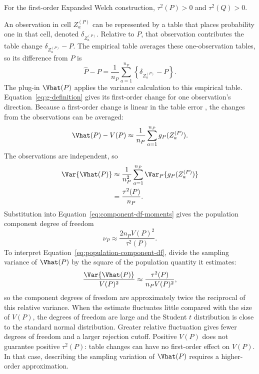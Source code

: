 \begin{assumption}
For the first-order Expanded Welch construction,
\(\tau^2(P)>0\) and \(\tau^2(Q)>0\).
\end{assumption}

An observation in cell \(Z_a^{(P)}\) can be represented by a table that places
probability one in that cell, denoted \(\delta_{Z_a^{(P)}}\). Relative to
\(P\), that observation contributes the table change
\(\delta_{Z_a^{(P)}}-P\). The empirical table averages these one-observation
tables, so its difference from \(P\) is
\begin{equation}
  \widehat P-P
  =\frac{1}{n_P}\sum_{a=1}^{n_P}
  \left\{\delta_{Z_a^{(P)}}-P\right\}.
\end{equation}
The plug-in \(\Vhat(P)\) applies the variance calculation to this empirical
table. Equation~\eqref{eq:g-definition} gives its first-order change for
one observation's direction. Because a first-order change is linear in the
table error \citep[Chapter~20]{vanderVaart1998}, the changes from the
observations can be averaged:
\begin{equation}
  \Vhat(P)-V(P)
  \approx
  \frac{1}{n_P}
  \sum_{a=1}^{n_P}g_P(Z_a^{(P)}).
  \label{eq:vhat-linearization}
\end{equation}
The observations are independent, so
\begin{align}
  \Var\{\Vhat(P)\}
  &\approx
  \frac{1}{n_P^2}
  \sum_{a=1}^{n_P}
  \Var_P\{g_P(Z_a^{(P)})\}\\*
  &=\frac{\tau^2(P)}{n_P}.
  \label{eq:vhat-sampling-variance}
\end{align}
Substitution into Equation~\eqref{eq:component-df-moments} gives the
population component degree of freedom
\begin{equation}
  \boxed{
  \nu_P
  \approx
  \frac{2n_PV(P)^2}{\tau^2(P)}
  }.
  \label{eq:population-component-df}
\end{equation}
To interpret Equation~\eqref{eq:population-component-df}, divide the
sampling variance of \(\Vhat(P)\) by the square of the population
quantity it estimates:
\begin{equation}
  \frac{\Var\{\Vhat(P)\}}{V(P)^2}
  \approx \frac{\tau^2(P)}{n_PV(P)^2},
\end{equation}
so the component degrees of freedom are approximately twice the reciprocal of
this relative variance. When the estimate fluctuates little compared with
the size of \(V(P)\), the degrees of freedom are large and the Student
\(t\) distribution is close to the standard normal distribution. Greater
relative fluctuation gives fewer degrees of freedom and a larger rejection
cutoff.
Positive \(V(P)\) does not guarantee positive \(\tau^2(P)\): table changes
can have no first-order effect on \(V(P)\). In that case, describing the
sampling variation of \(\Vhat(P)\) requires a higher-order approximation.

